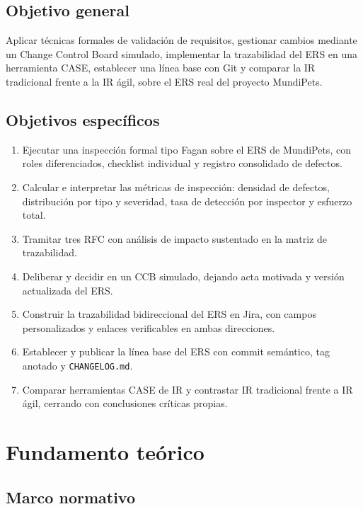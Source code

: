 \documentclass[journal,onecolumn]{IEEEtran}
\begin{document}
	\subsection{Objetivo general}
	
	Aplicar técnicas formales de validación de requisitos, gestionar cambios mediante un Change
	Control Board simulado, implementar la trazabilidad del ERS en una herramienta CASE, establecer
	una línea base con Git y comparar la IR tradicional frente a la IR ágil, sobre el ERS real del
	proyecto MundiPets.
	
	\subsection{Objetivos específicos}
	
	\begin{enumerate}[leftmargin=1.4em, itemsep=2pt, topsep=3pt]
		\item Ejecutar una inspección formal tipo Fagan sobre el ERS de MundiPets, con roles
		diferenciados, checklist individual y registro consolidado de defectos.
		\item Calcular e interpretar las métricas de inspección: densidad de defectos, distribución
		por tipo y severidad, tasa de detección por inspector y esfuerzo total.
		\item Tramitar tres RFC con análisis de impacto sustentado en la matriz de trazabilidad.
		\item Deliberar y decidir en un CCB simulado, dejando acta motivada y versión actualizada
		del ERS.
		\item Construir la trazabilidad bidireccional del ERS en Jira, con campos personalizados y
		enlaces verificables en ambas direcciones.
		\item Establecer y publicar la línea base del ERS con commit semántico, tag anotado y
		\texttt{CHANGELOG.md}.
		\item Comparar herramientas CASE de IR y contrastar IR tradicional frente a IR ágil, cerrando
		con conclusiones críticas propias.
	\end{enumerate}
	\newpage
	\section{Fundamento teórico}
	
	\subsection{Marco normativo}
	
\end{document}
